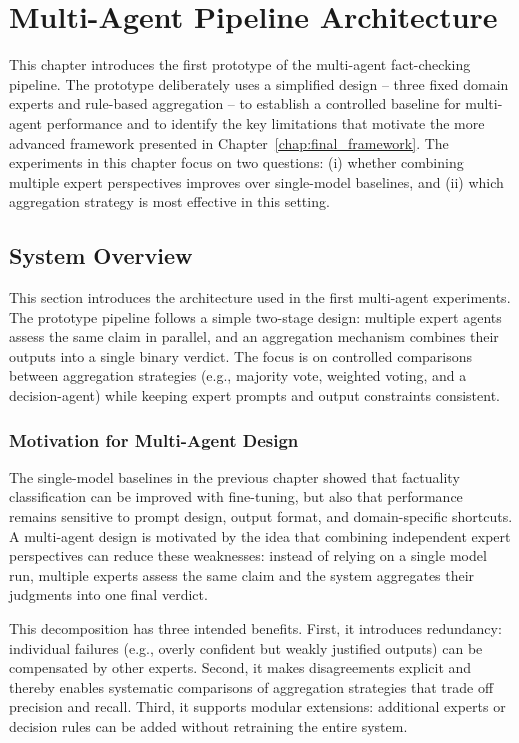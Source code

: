 \chapter{Multi-Agent Pipeline Architecture}
\label{chap:prototype_framework}

This chapter introduces the first prototype of the multi-agent fact-checking pipeline. The prototype deliberately uses a simplified 
design -- three fixed domain experts and rule-based aggregation -- to establish a controlled baseline for multi-agent performance and to identify the key limitations that motivate the more advanced framework presented in Chapter~\ref{chap:final_framework}. The 
experiments in this chapter focus on two questions: (i) whether combining multiple expert perspectives improves over single-model 
baselines, and (ii) which aggregation strategy is most effective in this setting.

\section{System Overview}

This section introduces the architecture used in the first multi-agent experiments.
The prototype pipeline follows a simple two-stage design: multiple expert agents assess the same claim in parallel, and an aggregation mechanism combines their outputs into a single binary verdict.
The focus is on controlled comparisons between aggregation strategies (e.g., majority vote, weighted voting, and a decision-agent) while keeping expert prompts and output constraints consistent.

\subsection{Motivation for Multi-Agent Design}

The single-model baselines in the previous chapter showed that factuality classification can be improved with fine-tuning, but also that performance remains sensitive to prompt design, output format, and domain-specific shortcuts.
A multi-agent design is motivated by the idea that combining independent expert perspectives can reduce these weaknesses: instead of relying on a single model run, multiple experts assess the same claim and the system aggregates their judgments into one final verdict.

This decomposition has three intended benefits.
First, it introduces redundancy: individual failures (e.g., overly confident but weakly justified outputs) can be compensated by other experts.
Second, it makes disagreements explicit and thereby enables systematic comparisons of aggregation strategies that trade off precision and recall.
Third, it supports modular extensions: additional experts or decision rules can be added without retraining the entire system.

